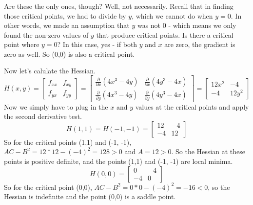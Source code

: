 \documentclass[10pt]{amsart}
\begin{document}
\begin{enumerate}
Are these the only ones, though? Well, not necessarily. Recall that in finding those critical points, we had to divide by $y$, which we cannot do when $y = 0$. In other words, we made an assumption that $y$ was not 0 - which means we only found the non-zero values of $y$ that produce critical points. Is there a critical point where $y = 0$? In this case, yes - if both $y$ and $x$ are zero, the gradient is zero as well. So (0,0) is also a critical point.

Now let's calulate the Hessian. 
\begin{equation*}
H(x,y) = \left[\begin{array}{rr}
f_{xx} & f_{xy}\\
f_{yx} & f_{yy} \end{array}\right]
= \left[\begin{array}{rr}
\frac{\partial}{\partial x}(4x^3 - 4y) & \frac{\partial}{\partial x}(4y^3 - 4x)\\
\frac{\partial}{\partial y}(4x^3 - 4y) &\frac{\partial}{\partial y}(4y^3 - 4x) \end{array}\right]
= \left[\begin{array}{rr}
12x^2 & -4 \\
-4 & 12y^2 \end{array}\right]
\end{equation*}
Now we simply have to plug in the $x$ and $y$ values at the critical points and apply the second derivative test. 
$$H(1,1) = H(-1, -1) = \left[\begin{array}{rr}
12  & -4 \\
-4 & 12 \end{array}\right] $$
So for the critical points (1,1) and (-1, -1), $AC - B^2 = 12*12-(-4)^2 = 128 > 0$ and $A = 12 > 0$. So the Hessian at these points is positive definite, and the points (1,1) and (-1, -1) are local minima.
$$H(0,0) =  \left[\begin{array}{rr}
0  & -4 \\
-4 & 0 \end{array}\right] $$
So for the critical point (0,0), $AC - B^2 = 0*0 - (-4)^2 = -16 < 0$, so the Hessian is indefinite and the point (0,0) is a saddle point.


\end{enumerate}
\end{document}
